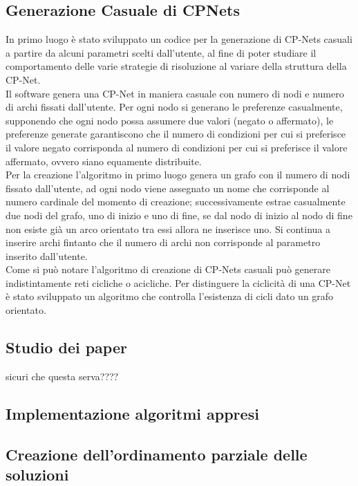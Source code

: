 \documentclass[a4paper,titlepage]{article}
\begin{document}
\subsection{Generazione Casuale di CPNets}
In primo luogo è stato sviluppato un codice per la generazione di CP-Nets casuali a partire da alcuni parametri scelti dall'utente, al fine di poter studiare il comportamento delle varie strategie di risoluzione al variare della struttura della CP-Net.\\
Il software genera una CP-Net in maniera casuale con numero di nodi e numero di archi fissati dall'utente. Per ogni nodo si generano le preferenze casualmente, supponendo che ogni nodo possa assumere due valori (negato o affermato), le preferenze generate garantiscono che il numero di condizioni per cui si preferisce il valore negato corrisponda al numero di condizioni per cui si preferisce il valore affermato, ovvero siano equamente distribuite.\\
Per la creazione l'algoritmo in primo luogo genera un grafo con il numero di nodi fissato dall'utente, ad ogni nodo viene assegnato un nome che corrisponde al numero cardinale del momento di creazione; successivamente estrae casualmente due nodi del grafo, uno di inizio e uno di fine, se dal nodo di inizio al nodo di fine non esiste già un arco orientato tra essi allora ne inserisce uno. Si continua a inserire archi fintanto che il numero di archi non corrisponde al parametro inserito dall'utente.\\
Come si può notare l'algoritmo di creazione di CP-Nets casuali può generare indistintamente reti cicliche o acicliche. Per distinguere la ciclicità di una CP-Net è stato sviluppato un algoritmo che controlla l'esistenza di cicli dato un grafo orientato.
\subsection{Studio dei paper} 

sicuri che questa serva????
\subsection{Implementazione algoritmi appresi}

\subsection{Creazione dell'ordinamento parziale delle soluzioni}
\end{document}
